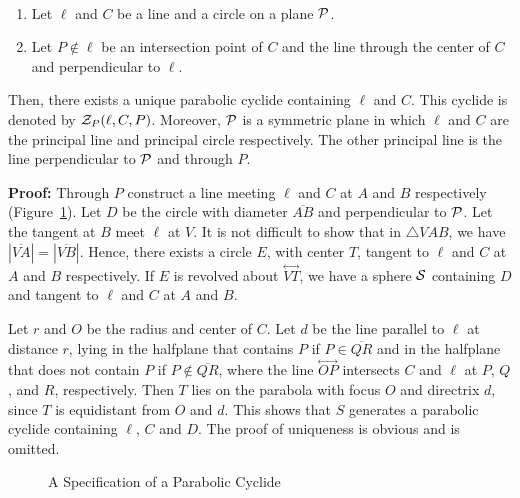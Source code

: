 \begin{lemma}
\label{lemma:para-construction} \ \\
\begin{enumerate}
     \item Let $\ell$ and $C$ be a line and a circle on a plane ${\cal P}$.  
     \item Let $P\not\in\ell$ be an intersection point of $C$ and the 
          line through the center of $C$ and perpendicular to $\ell$.  
\end{enumerate}
Then, there exists a unique parabolic cyclide containing $\ell$ and $C$.
This cyclide is denoted by ${\cal Z}_P(\ell,C,P)$.
Moreover, ${\cal P}$ is a symmetric plane in which $\ell$ and $C$ are the 
principal line and principal circle respectively.  The other principal line
is the line perpendicular to ${\cal P}$ and through $P$.
\end{lemma}
{\bf Proof:}  Through $P$ construct a line meeting $\ell$ and $C$ at $A$ and 
$B$ respectively (Figure~\ref{fig:para-const}).  
Let $D$ be the circle with diameter
$\overline{AB}$ and perpendicular to ${\cal P}$.
Let the tangent at $B$ meet $\ell$ at $V$.  It is not
difficult to show that in $\bigtriangleup VAB$, we have
$|\overline{VA}|=|\overline{VB}|$.  Hence, there exists a circle $E$, with
center $T$,  tangent to $\ell$ and $C$ at $A$ and $B$ respectively.  If $E$ is
revolved about $\stackrel{\longleftrightarrow}{VT}$, we have a sphere 
${\cal S}$ containing $D$ and tangent to $\ell$ and $C$ at $A$ and $B$.

     Let $r$ and $O$ be the radius and center of $C$.  Let $d$ be the line
parallel to $\ell$ at distance $r$, lying in the halfplane that contains $P$
if $P\in\overline{QR}$ and in the halfplane that does not contain $P$ if
$P\not\in\overline{QR}$, where the line $\stackrel{\longleftrightarrow}{OP}$
intersects $C$ and $\ell$ at $P$, $Q$, and $R$, respectively.  Then $T$ lies 
on the parabola with focus $O$ and directrix $d$, since $T$ is equidistant
from $O$ and $d$.  This shows that $S$ generates a parabolic cyclide
containing $\ell$, $C$ and $D$.  The proof of uniqueness is obvious and is
omitted.  \QED
\begin{figure}
\vspace{5.5cm}
\caption{A Specification of a Parabolic Cyclide}
\label{fig:para-const}
\end{figure}


